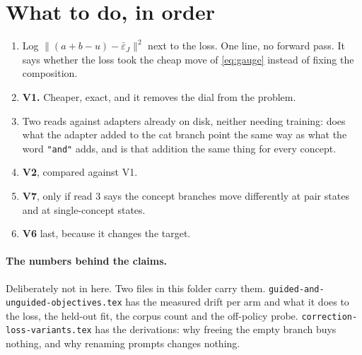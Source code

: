 \documentclass[11pt]{article}
\newcommand{\eps}{\varepsilon}
\newcommand{\B}[1]{\textbf{#1}}
\begin{document}
\section{What to do, in order}

\begin{enumerate}
\item Log $\lVert (a+b-u) - \bar\eps_J\rVert^2$ next to the loss. One line, no forward pass. It says
  whether the loss took the cheap move of \eqref{eq:gauge} instead of fixing the composition.
\item \B{V1.} Cheaper, exact, and it removes the dial from the problem.
\item Two reads against adapters already on disk, neither needing training: does what the adapter
  added to the cat branch point the same way as what the word \texttt{"and"} adds, and is that
  addition the same thing for every concept.
\item \B{V2}, compared against V1.
\item \B{V7}, only if read 3 says the concept branches move differently at pair states and at
  single-concept states.
\item \B{V6} last, because it changes the target.
\end{enumerate}

\paragraph{The numbers behind the claims.}
Deliberately not in here. Two files in this folder carry them.
\texttt{guided-and-unguided-objectives.tex} has the measured drift per arm and what it does to the
loss, the held-out fit, the corpus count and the off-policy probe.
\texttt{correction-loss-variants.tex} has the derivations: why freeing the empty branch buys
nothing, and why renaming prompts changes nothing.
\end{document}
